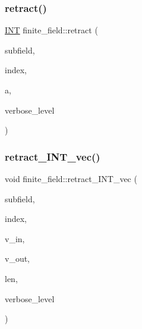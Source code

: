 \mbox{\label{classfinite__field_acb54b697bd9f35302817ea8e62d2ed9b}} 
\subsubsection{\texorpdfstring{retract()}{retract()}}
{\footnotesize\ttfamily \mbox{\hyperlink{galois_8h_a09fddde158a3a20bd2dcadb609de11dc}{I\+NT}} finite\+\_\+field\+::retract (\begin{DoxyParamCaption}\item[{\mbox{\hyperlink{classfinite__field}{finite\+\_\+field}} \&}]{subfield,  }\item[{\mbox{\hyperlink{galois_8h_a09fddde158a3a20bd2dcadb609de11dc}{I\+NT}}}]{index,  }\item[{\mbox{\hyperlink{galois_8h_a09fddde158a3a20bd2dcadb609de11dc}{I\+NT}}}]{a,  }\item[{\mbox{\hyperlink{galois_8h_a09fddde158a3a20bd2dcadb609de11dc}{I\+NT}}}]{verbose\+\_\+level }\end{DoxyParamCaption})}

\mbox{\label{classfinite__field_acfdc645b9483323fcded9e6d5b2eccc9}} 
\subsubsection{\texorpdfstring{retract\+\_\+\+I\+N\+T\+\_\+vec()}{retract\_INT\_vec()}}
{\footnotesize\ttfamily void finite\+\_\+field\+::retract\+\_\+\+I\+N\+T\+\_\+vec (\begin{DoxyParamCaption}\item[{\mbox{\hyperlink{classfinite__field}{finite\+\_\+field}} \&}]{subfield,  }\item[{\mbox{\hyperlink{galois_8h_a09fddde158a3a20bd2dcadb609de11dc}{I\+NT}}}]{index,  }\item[{\mbox{\hyperlink{galois_8h_a09fddde158a3a20bd2dcadb609de11dc}{I\+NT}} $\ast$}]{v\+\_\+in,  }\item[{\mbox{\hyperlink{galois_8h_a09fddde158a3a20bd2dcadb609de11dc}{I\+NT}} $\ast$}]{v\+\_\+out,  }\item[{\mbox{\hyperlink{galois_8h_a09fddde158a3a20bd2dcadb609de11dc}{I\+NT}}}]{len,  }\item[{\mbox{\hyperlink{galois_8h_a09fddde158a3a20bd2dcadb609de11dc}{I\+NT}}}]{verbose\+\_\+level }\end{DoxyParamCaption})}

